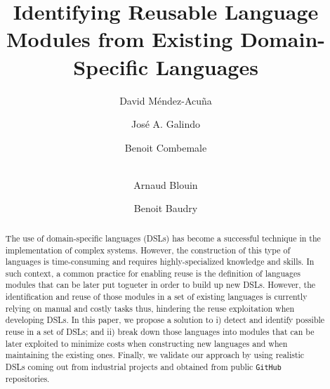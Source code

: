 \documentclass[runningheads,a4paper]{llncs}
\begin{document}
\mainmatter  %

\title{Identifying Reusable Language Modules from Existing Domain-Specific Languages}


\author{David M\'endez-Acu\~na \and Jos\'e A. Galindo \and Benoit Combemale \and \\ Arnaud Blouin \and Benoit Baudry}

\maketitle

\begin{abstract} 

The use of domain-specific languages (DSLs) has become a successful technique in the implementation of complex systems. However, the construction of this type of languages is time-consuming and requires highly-specialized knowledge and skills. 
In such context, a common practice for enabling reuse is the definition of languages modules that can be later put togueter  in order to build up new DSLs. However, the identification and reuse of those modules in a set of existing languages is currently relying on manual and costly tasks thus, hindering the reuse exploitation when developing DSLs. 
In this paper, we propose a solution to i) detect and identify possible reuse in a set of DSLs; and ii) break down those languages into modules that can be later exploited to minimize costs when constructing new languages and when maintaining the existing ones. Finally, we validate our approach by using realistic DSLs coming out from industrial projects and obtained from public \texttt{GitHub} repositories.

\end{abstract}
\end{document}
